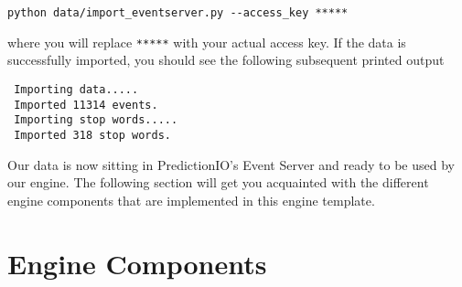 \documentclass[a4paper,12pt]{article}
\renewcommand{\tt}[1]{\texttt{#1}}
\newcommand{\3}{\left}
\newcommand{\4}{\right}
\renewcommand{\-}[1]{{}^{-#1}}
\begin{document}
\begin{verbatim}
python data/import_eventserver.py --access_key *****
\end{verbatim}

where you will replace \tt{*****} with your actual access key. If the data is successfully imported, you should see the following subsequent printed output
 
 \begin{verbatim}
 Importing data.....
 Imported 11314 events.
 Importing stop words.....
 Imported 318 stop words.
 \end{verbatim}
 
Our data is now sitting in PredictionIO's Event Server and ready to be used by our engine. The following section will get you acquainted with the different engine components that are implemented in this engine template.

\break

\section*{Engine Components}
\end{document}
